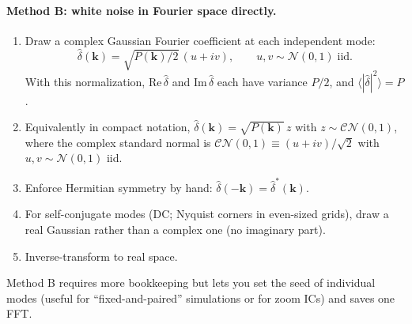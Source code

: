 \documentclass[12pt]{article}
\begin{document}
\paragraph{Method B: white noise in Fourier space directly.}
\begin{enumerate}
\item Draw a complex Gaussian Fourier coefficient at each independent
      mode:
      \begin{equation}
        \hat\delta(\mathbf k) = \sqrt{P(\mathbf k)/2}\,(u + iv),
        \qquad u,v\sim\mathcal N(0,1)\;\text{iid}.
      \end{equation}
      With this normalization,
      $\mathrm{Re}\,\hat\delta$ and $\mathrm{Im}\,\hat\delta$ each have
      variance $P/2$, and $\langle|\hat\delta|^2\rangle = P$.
\item Equivalently in compact notation,
      $\hat\delta(\mathbf k) = \sqrt{P(\mathbf k)}\,z$ with
      $z\sim\mathcal{CN}(0,1)$, where the complex standard normal is
      $\mathcal{CN}(0,1)\equiv (u+iv)/\sqrt 2$ with $u,v\sim\mathcal N(0,1)$ iid.
\item Enforce Hermitian symmetry by hand:
      $\hat\delta(-\mathbf k) = \hat\delta^*(\mathbf k)$.
\item For self-conjugate modes (DC; Nyquist corners in even-sized
      grids), draw a real Gaussian rather than a complex one (no
      imaginary part).
\item Inverse-transform to real space.
\end{enumerate}
Method B requires more bookkeeping but lets you set the seed of
individual modes (useful for ``fixed-and-paired'' simulations or for
zoom ICs) and saves one FFT.
\end{document}
